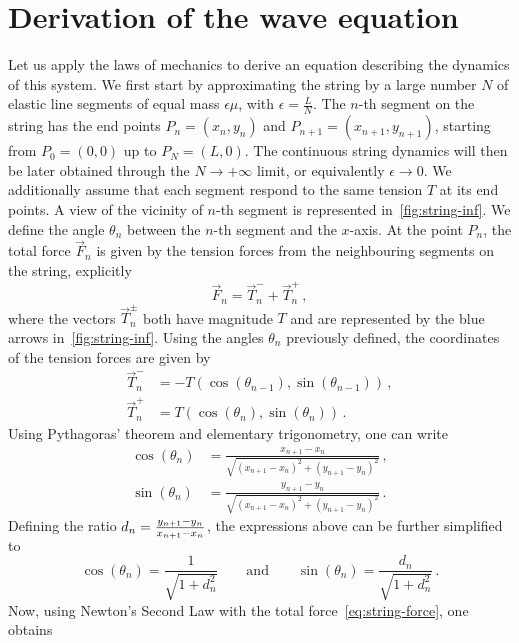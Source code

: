 \section{Derivation of the wave equation}
Let us apply the laws of mechanics to derive an equation describing the dynamics of this
system. We first start by approximating the string by a large number $N$ of elastic line
segments of equal mass $\epsilon\mu$, with $\epsilon=\frac{L}{N}$. The $n$-th segment on
the string has the end points $P_n=(x_n,y_n)$ and $P_{n+1}=(x_{n+1},y_{n+1})$, starting
from $P_0=(0,0)$ up to $P_N=(L,0)$. The continuous string dynamics will then be later
obtained through the $N\to+\infty$ limit, or equivalently $\epsilon\to 0$. We
additionally assume that each segment respond to the same tension $T$ at its end points.
A view of the vicinity of $n$-th segment is represented in~\cref{fig:string-inf}. We
define the angle $\theta_n$ between the $n$-th segment and the $x$-axis. At the point
$P_n$, the total force $\vec{F}_n$ is given by the tension forces from the neighbouring
segments on the string, explicitly
\begin{equation}
	\vec{F}_n=\vec{T}_n^-+\vec{T}_n^+\,,\label{eq:string-force}
\end{equation}
where the vectors $\vec{T}_n^\pm$ both have magnitude $T$ and are represented by the blue
arrows in~\cref{fig:string-inf}. Using the angles $\theta_n$ previously defined, the
coordinates of the tension forces are given by
\begin{align}
	\vec{T}_n^- & =-T(\cos(\theta_{n-1}),\sin(\theta_{n-1}))\,,\label{eq:stringtm} \\
	\vec{T}_n^+ & =T(\cos(\theta_{n}),\sin(\theta_{n}))\,.\label{eq:stringtp}
\end{align}
Using Pythagoras' theorem and elementary trigonometry, one can write
\begin{align}
	\cos(\theta_n) & =\frac{x_{n+1}-x_n}{\sqrt{(x_{n+1}-x_n)^2+(y_{n+1}-y_n)^2}}\,, \\
	\sin(\theta_n) & =\frac{y_{n+1}-y_n}{\sqrt{(x_{n+1}-x_n)^2+(y_{n+1}-y_n)^2}}\,.
\end{align}
Defining the ratio $d_n=\smash{\frac{y_{n+1}-y_n}{x_{n+1}-x_n}}$, the expressions above
can be further simplified to
\begin{equation}
	\cos(\theta_n)=\frac{1}{\sqrt{1+d_n^2}}\qquad\text{and}\qquad
	\sin(\theta_n)=\frac{d_n}{\sqrt{1+d_n^2}}\,.\label{eq:csthetan}
\end{equation}
Now, using Newton's Second Law with the total force~\cref{eq:string-force}, one obtains
